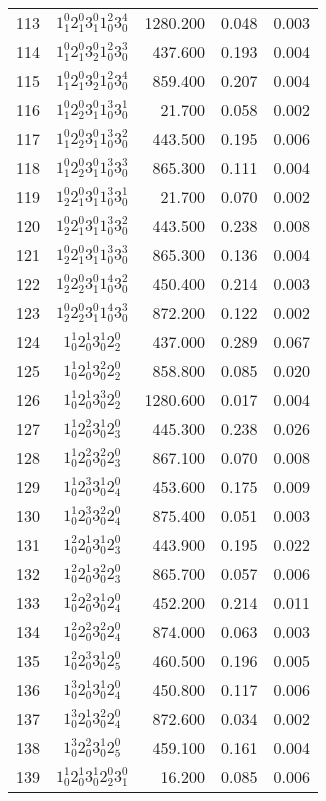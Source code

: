 \documentclass{revtex4}
\begin{document}
\begin{table}
\begin{tabular}{rcrrr}
113&$1_1^0 2_1^0 3_1^0 1_0^2 3_0^4$& 1280.200& 0.048& 0.003\\
114&$1_1^0 2_1^0 3_2^0 1_0^2 3_0^3$& 437.600& 0.193& 0.004\\
115&$1_1^0 2_1^0 3_2^0 1_0^2 3_0^4$& 859.400& 0.207& 0.004\\
116&$1_1^0 2_2^0 3_1^0 1_0^3 3_0^1$& 21.700& 0.058& 0.002\\
117&$1_1^0 2_2^0 3_1^0 1_0^3 3_0^2$& 443.500& 0.195& 0.006\\
118&$1_1^0 2_2^0 3_1^0 1_0^3 3_0^3$& 865.300& 0.111& 0.004\\
119&$1_2^0 2_1^0 3_1^0 1_0^3 3_0^1$& 21.700& 0.070& 0.002\\
120&$1_2^0 2_1^0 3_1^0 1_0^3 3_0^2$& 443.500& 0.238& 0.008\\
121&$1_2^0 2_1^0 3_1^0 1_0^3 3_0^3$& 865.300& 0.136& 0.004\\
122&$1_2^0 2_2^0 3_1^0 1_0^4 3_0^2$& 450.400& 0.214& 0.003\\
123&$1_2^0 2_2^0 3_1^0 1_0^4 3_0^3$& 872.200& 0.122& 0.002\\
124&$1_0^1 2_0^1 3_0^1 2_2^0$& 437.000& 0.289& 0.067\\
125&$1_0^1 2_0^1 3_0^2 2_2^0$& 858.800& 0.085& 0.020\\
126&$1_0^1 2_0^1 3_0^3 2_2^0$& 1280.600& 0.017& 0.004\\
127&$1_0^1 2_0^2 3_0^1 2_3^0$& 445.300& 0.238& 0.026\\
128&$1_0^1 2_0^2 3_0^2 2_3^0$& 867.100& 0.070& 0.008\\
129&$1_0^1 2_0^3 3_0^1 2_4^0$& 453.600& 0.175& 0.009\\
130&$1_0^1 2_0^3 3_0^2 2_4^0$& 875.400& 0.051& 0.003\\
131&$1_0^2 2_0^1 3_0^1 2_3^0$& 443.900& 0.195& 0.022\\
132&$1_0^2 2_0^1 3_0^2 2_3^0$& 865.700& 0.057& 0.006\\
133&$1_0^2 2_0^2 3_0^1 2_4^0$& 452.200& 0.214& 0.011\\
134&$1_0^2 2_0^2 3_0^2 2_4^0$& 874.000& 0.063& 0.003\\
135&$1_0^2 2_0^3 3_0^1 2_5^0$& 460.500& 0.196& 0.005\\
136&$1_0^3 2_0^1 3_0^1 2_4^0$& 450.800& 0.117& 0.006\\
137&$1_0^3 2_0^1 3_0^2 2_4^0$& 872.600& 0.034& 0.002\\
138&$1_0^3 2_0^2 3_0^1 2_5^0$& 459.100& 0.161& 0.004\\
139&$1_0^1 2_0^1 3_0^1 2_2^0 3_1^0$& 16.200& 0.085& 0.006\\

\end{tabular}
\end{table}
\end{document}
